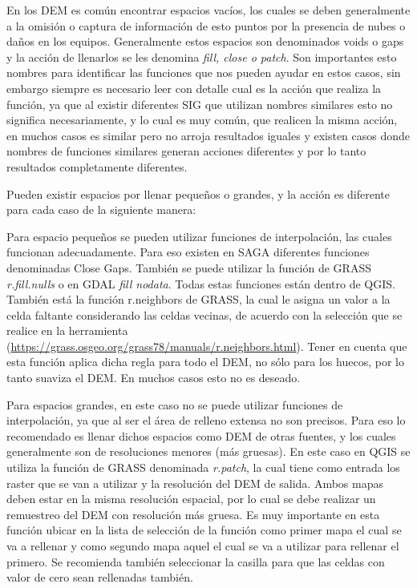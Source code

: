 \documentclass[a4paper,oneside,11pt,]{article}
\begin{document}
En los DEM es común encontrar espacios vacíos, los cuales se deben generalmente a la omisión o captura de información de esto puntos por la presencia de nubes o daños en los equipos. Generalmente estos espacios son denominados voids o gaps y la acción de llenarlos se les denomina \emph{fill, close o patch}. Son importantes esto nombres para identificar las funciones que nos pueden ayudar en estos casos, sin embargo siempre es necesario leer con detalle cual es la acción que realiza la función, ya que al existir diferentes SIG que utilizan nombres similares esto no significa necesariamente, y lo cual es muy común, que realicen la misma acción, en muchos casos es similar pero no arroja resultados iguales y existen casos donde nombres de funciones similares generan acciones diferentes y por lo tanto resultados completamente diferentes.
\par Pueden existir espacios por llenar pequeños o grandes, y la acción es diferente para cada caso de la siguiente manera:
\par Para espacio pequeños se pueden utilizar funciones de interpolación, las cuales funcionan adecuadamente. Para eso existen en SAGA diferentes funciones denominadas Close Gaps. También se puede utilizar la función de GRASS \emph{r.fill.nulls} o en GDAL \emph{fill nodata}. Todas estas funciones están dentro de QGIS. También está la función r.neighbors de GRASS, la cual le asigna un valor a la celda faltante considerando las celdas vecinas, de acuerdo con la selección que se realice en la herramienta (\url{https://grass.osgeo.org/grass78/manuals/r.neighbors.html}). Tener en cuenta que esta función aplica dicha regla para todo el DEM, no sólo para los huecos, por lo tanto suaviza el DEM. En muchos casos esto no es deseado.
\par Para espacios grandes, en este caso no se puede utilizar funciones de interpolación, ya que al ser el área de relleno extensa no son precisos. Para eso lo recomendado es llenar dichos espacios como DEM de otras fuentes, y los cuales generalmente son de resoluciones menores (más gruesas). En este caso en QGIS se utiliza la función de GRASS denominada \emph{r.patch}, la cual tiene como entrada los raster que se van a utilizar y la resolución del DEM de salida. Ambos mapas deben estar en la misma resolución espacial, por lo cual se debe realizar un remuestreo del DEM con resolución más gruesa. Es muy importante en esta función ubicar en la lista de selección de la función como primer mapa el cual se va a rellenar y como segundo mapa aquel el cual se va a utilizar para rellenar el primero. Se recomienda también seleccionar la casilla para que las celdas con valor de cero sean rellenadas también.
\end{document}
